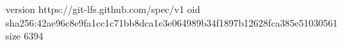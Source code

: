version https://git-lfs.github.com/spec/v1
oid sha256:42ae96c8e9fa1cc1c71bb8dca1e3e064989b34f1897b12628fca385e51030561
size 6394
